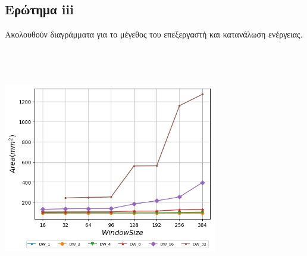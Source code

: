 \subsection{Ερώτημα iii}
   Ακολουθούν διαγράμματα για το μέγεθος του επεξεργαστή και κατανάλωση ενέργειας.    
   \\\\\\
   \begin{minipage}{\textwidth}
      \begin{center}
         \\
         \vspace{3mm}
         \includegraphics[width=0.7\textwidth]{./graphs/area/area.png}
         \vspace{6mm}
      \end{center}
   \end{minipage}

